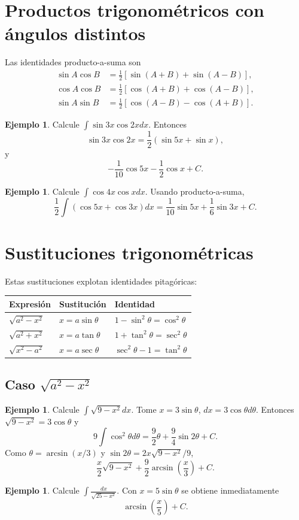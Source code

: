 \documentclass[12pt]{article}
\theoremstyle{definition}\newtheorem{definicion}[teorema]{Definición}\newtheorem{ejemplo}[teorema]{Ejemplo}\newtheorem{ejercicio}[teorema]{Ejercicio}
\theoremstyle{remark}\newtheorem*{observacion}{Observación}\newtheorem*{advertencia}{Advertencia}\newtheorem*{estrategia}{Estrategia}
\begin{document}
\section{Productos trigonométricos con ángulos distintos}
Las identidades producto-a-suma son
\begin{align*}
\sin A\cos B&=\tfrac12[\sin(A+B)+\sin(A-B)],\\
\cos A\cos B&=\tfrac12[\cos(A+B)+\cos(A-B)],\\
\sin A\sin B&=\tfrac12[\cos(A-B)-\cos(A+B)].
\end{align*}
\begin{ejemplo}Calcule $\int\sin3x\cos2x dx$. Entonces
\[\sin3x\cos2x=\frac12(\sin5x+\sin x),\]
y
\[\boxed{-\frac1{10}\cos5x-\frac12\cos x+C}.\]\end{ejemplo}
\begin{ejemplo}Calcule $\int\cos4x\cos xdx$. Usando producto-a-suma,
\[\frac12\int(\cos5x+\cos3x)dx=\boxed{\frac1{10}\sin5x+\frac16\sin3x+C}.\]\end{ejemplo}

\section{Sustituciones trigonométricas}
Estas sustituciones explotan identidades pitagóricas:
\begin{center}\begin{tabular}{lll}\toprule
Expresión & Sustitución & Identidad\\\midrule
$\sqrt{a^2-x^2}$ & $x=a\sin\theta$ & $1-\sin^2\theta=\cos^2\theta$\\
$\sqrt{a^2+x^2}$ & $x=a\tan\theta$ & $1+\tan^2\theta=\sec^2\theta$\\
$\sqrt{x^2-a^2}$ & $x=a\sec\theta$ & $\sec^2\theta-1=\tan^2\theta$\\\bottomrule
\end{tabular}\end{center}
\subsection{Caso $\sqrt{a^2-x^2}$}
\begin{ejemplo}Calcule $\int\sqrt{9-x^2}dx$. Tome $x=3\sin\theta$, $dx=3\cos\theta d\theta$. Entonces $\sqrt{9-x^2}=3\cos\theta$ y
\[9\int\cos^2\theta d\theta=\frac92\theta+\frac94\sin2\theta+C.\]
Como $\theta=\arcsin(x/3)$ y $\sin2\theta=2x\sqrt{9-x^2}/9$,
\[\boxed{\frac{x}{2}\sqrt{9-x^2}+\frac92\arcsin\left(\frac{x}{3}\right)+C}.\]\end{ejemplo}
\begin{ejemplo}Calcule $\int\frac{dx}{\sqrt{25-x^2}}$. Con $x=5\sin\theta$ se obtiene inmediatamente
\[\boxed{\arcsin\left(\frac{x}{5}\right)+C}.\]\end{ejemplo}
\end{document}

